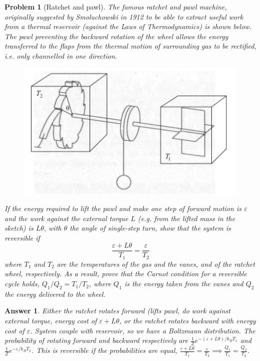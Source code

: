 \documentclass[a4paper]{article}
\theoremstyle{new2}
\newtheorem{ans}{Answer}[section]
\theoremstyle{new}
\newtheorem{qns}{Problem}[section]
\begin{document}
\begin{qns}[Ratchet and pawl]
The famous ratchet and pawl machine, originally suggested by Smoluchowski in 1912 to be able to extract useful work from a thermal reservoir (against the Laws of Thermodynamics) is shown below. The pawl preventing the backward rotation of the wheel allows the energy transferred to the flaps from the thermal motion of surrounding gas to be rectified, i.e. only channelled in one direction.
\begin{figure}[H]
    \centering
    \includegraphics{TSPEx4Q10.JPG}
\end{figure}
If the energy required to lift the pawl and make one step of forward motion is $\varepsilon$ and the work against the external torque $L$ (e.g. from the lifted mass in the sketch) is $L\theta$, with $\theta$ the angle of single-step turn, show that the system is reversible if
$$\frac{\varepsilon+L\theta}{T_1}=\frac{\varepsilon}{T_2}$$
where $T_1$ and $T_2$ are the temperatures of the gas and the vanes, and of the ratchet wheel, respectively. As a result, prove that the Carnot condition for a reversible cycle holds, $Q_1/Q_2=T_1/T_2$, where $Q_1$ is the energy taken from the vanes and $Q_2$ the energy delivered to the wheel. 
\end{qns}
\begin{ans}
Either the ratchet rotates forward (lifts pawl, do work against external torque, energy cost of $\varepsilon+L\theta$, or the ratchet rotates backward with energy cost of $\varepsilon$. System couple with reservoir, so we have a Boltzmann distribution. The probability of rotating forward and backward respectively are $\frac{1}{Z}e^{-(\varepsilon+L\theta)/k_BT_1}$ and $\frac{1}{Z}e^{-\varepsilon/k_BT_2}$. This is reversible if the probabilities are equal, $\frac{\varepsilon+L\theta}{T_1}=\frac{\varepsilon}{T_2}\implies\frac{Q_1}{T_1}=\frac{Q_2}{T_2}$.
\end{ans}
\end{document}
